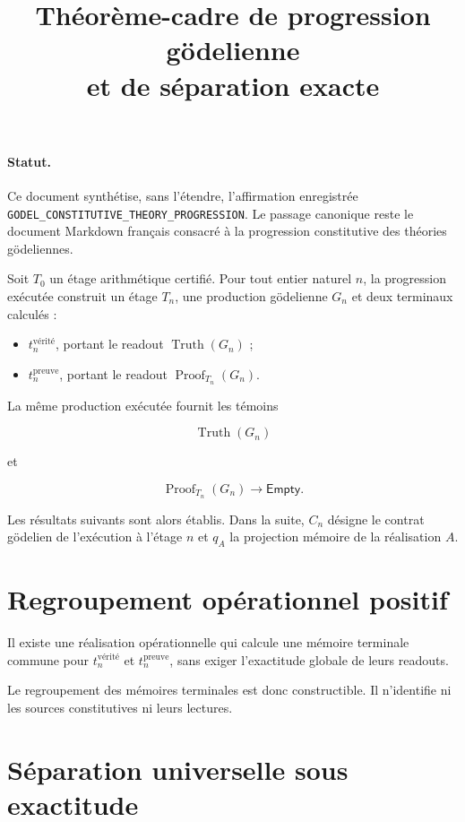 \documentclass[11pt,a4paper]{article}
\title{Théorème-cadre de progression gödelienne\\
et de séparation exacte}
\author{}
\date{}
\newcommand{\Truth}{\operatorname{Truth}}
\newcommand{\Proof}{\operatorname{Proof}}
\newcommand{\Empty}{\mathsf{Empty}}
\begin{document}
\maketitle

\paragraph{Statut.}
Ce document synthétise, sans l'étendre, l'affirmation enregistrée
\texttt{GODEL\_CONSTITUTIVE\_THEORY\_PROGRESSION}. Le passage canonique reste
le document Markdown français consacré à la progression constitutive des
théories gödeliennes.

Soit $T_0$ un étage arithmétique certifié. Pour tout entier naturel $n$,
la progression exécutée construit un étage $T_n$, une production gödelienne
$G_n$ et deux terminaux calculés :

\begin{itemize}
  \item $t^{\mathrm{vérité}}_n$, portant le readout $\Truth(G_n)$ ;
  \item $t^{\mathrm{preuve}}_n$, portant le readout $\Proof_{T_n}(G_n)$.
\end{itemize}

La même production exécutée fournit les témoins

\[
  \Truth(G_n)
\]

et

\[
  \Proof_{T_n}(G_n) \longrightarrow \Empty.
\]

Les résultats suivants sont alors établis. Dans la suite, $C_n$ désigne le
contrat gödelien de l'exécution à l'étage $n$ et $q_A$ la projection mémoire
de la réalisation $A$.

\section{Regroupement opérationnel positif}

Il existe une réalisation opérationnelle qui calcule une mémoire terminale
commune pour $t^{\mathrm{vérité}}_n$ et $t^{\mathrm{preuve}}_n$, sans exiger
l'exactitude globale de leurs readouts.

Le regroupement des mémoires terminales est donc constructible. Il n'identifie
ni les sources constitutives ni leurs lectures.

\section{Séparation universelle sous exactitude}
\end{document}
